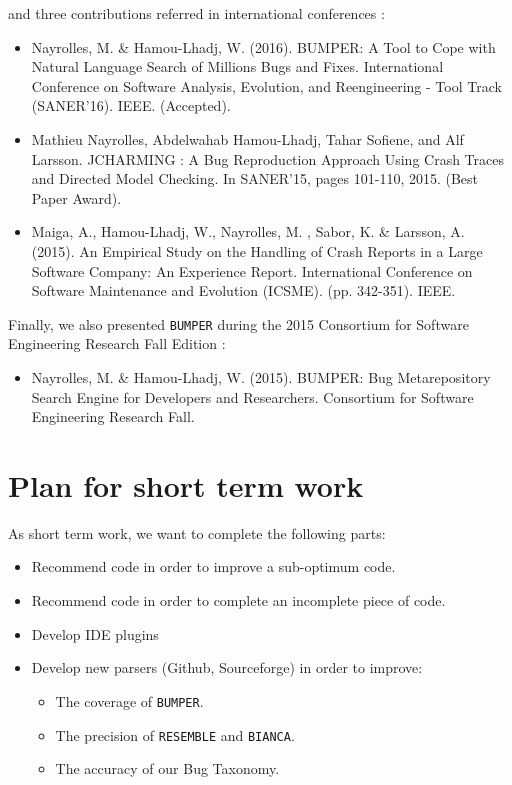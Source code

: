 and three contributions referred in international conferences \cite{Nayrolles2015,Maiga2014,Nayrolles2016b, Nayrolles2016c}:

\begin{itemize}
	\item Nayrolles, M. \& Hamou-Lhadj, W. (2016). BUMPER: A Tool to Cope with Natural Language Search of Millions Bugs and Fixes. International Conference on Software Analysis, Evolution, and Reengineering - Tool Track (SANER'16). IEEE. (Accepted).
	\item Mathieu Nayrolles, Abdelwahab Hamou-Lhadj, Tahar Sofiene, and Alf Larsson. JCHARMING : A Bug Reproduction Approach Using Crash Traces and Directed Model Checking. In SANER'15, pages 101-110, 2015. (Best Paper Award).
	\item Maiga, A., Hamou-Lhadj, W., Nayrolles, M. , Sabor, K. \& Larsson, A. (2015). An Empirical Study on the Handling of Crash Reports in a Large Software Company: An Experience Report. International Conference on Software Maintenance and Evolution (ICSME). (pp. 342-351). IEEE.
\end{itemize}

Finally, we also presented {\tt BUMPER} during the 2015 Consortium for Software Engineering Research Fall Edition \cite{Nayrolles2015e}:

\begin{itemize}
	\item Nayrolles, M. \& Hamou-Lhadj, W. (2015). BUMPER: Bug Metarepository Search Engine for Developers and Researchers. Consortium for Software Engineering Research Fall.
\end{itemize}

\section{Plan for short term work\label{sec:planning}}

As short term work, we want to complete the following parts:

\begin{itemize}
	\item Recommend code in order to improve a sub-optimum code.
	\item Recommend code in order to complete an incomplete piece of code.
	\item Develop IDE plugins
	\item Develop new parsers (Github, Sourceforge) in order to improve:
	\begin{itemize}
		\item The coverage of {\tt BUMPER}.
		\item The precision of {\tt RESEMBLE} and {\tt BIANCA}.
		\item The accuracy of our Bug Taxonomy.
	\end{itemize}
\end{itemize}

